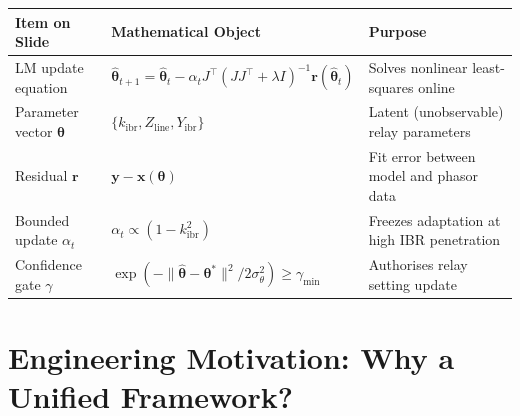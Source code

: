 \documentclass[12pt,a4paper]{article}
\newcommand{\kibr}{k_\mathrm{ibr}}
\newcommand{\thetahat}{\hat{\bm{\theta}}}
\newcommand{\thetastar}{\bm{\theta}^*}
\newcommand{\rvec}{\mathbf{r}}
\newcommand{\gmin}{\gamma_\mathrm{min}}
\newcommand{\sigth}{\sigma_\theta}
\begin{document}
\begin{center}
\small
\begin{tabular}{@{}lll@{}}
\toprule
\textbf{Item on Slide} & \textbf{Mathematical Object} & \textbf{Purpose} \\
\midrule
LM update equation      & $\thetahat_{t+1} = \thetahat_t - \alpha_t J^\top(JJ^\top+\lambda I)^{-1}\rvec(\thetahat_t)$
                          & Solves nonlinear least-squares online \\
Parameter vector $\bm{\theta}$ & $\{\kibr, Z_\mathrm{line}, Y_\mathrm{ibr}\}$
                          & Latent (unobservable) relay parameters \\
Residual $\rvec$         & $\mathbf{y} - \mathbf{x}(\bm{\theta})$
                          & Fit error between model and phasor data \\
Bounded update $\alpha_t$& $\alpha_t \propto (1-\kibr^2)$
                          & Freezes adaptation at high IBR penetration \\
Confidence gate $\gamma$ & $\exp(-\|\thetahat-\thetastar\|^2/2\sigth^2) \geq \gmin$
                          & Authorises relay setting update \\
\bottomrule
\end{tabular}
\end{center}

\section{Engineering Motivation: Why a Unified Framework?}
\end{document}
